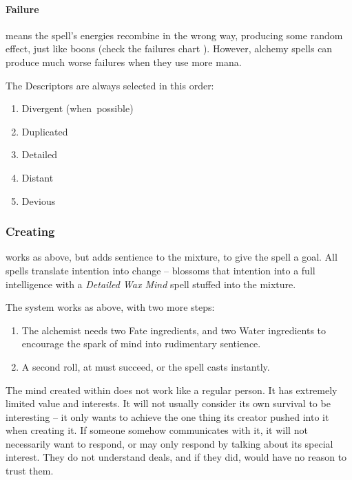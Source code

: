 \begin{multicols}{2}
\paragraph{Failure}
means the spell's energies recombine in the wrong way, producing some random effect, just like \glspl{boon} (check the failures chart ).
However, \gls{alchemy} spells can produce much worse failures when they use more mana.

The Descriptors are always selected in this order:

\begin{multicols}{2}
  \begin{enumerate}
  \raggedright
    \item
    Divergent (when~possible)
    \item
    Duplicated
    \item
    Detailed
    \item
    Distant
    \item
    Devious
  \end{enumerate}
\end{multicols}

\subsubsection{Creating }
works as above, but adds sentience to the mixture, to give the spell a goal.
All spells translate intention into change --  blossoms that intention into a full intelligence with a \textit{Detailed Wax Mind} spell stuffed into the mixture.

The system works as above, with two more steps:

\begin{enumerate}
  \item
  The alchemist needs two Fate \glspl{ingredient}, and two Water \glspl{ingredient} to encourage the spark of mind into rudimentary sentience.
  \item
  A second roll, at \tn[9] must succeed, or the spell casts instantly.
\end{enumerate}

The mind created within  does not work like a regular person.
It has extremely limited value and interests.
It will not usually consider its own survival to be interesting -- it only wants to achieve the one thing its creator pushed into it when creating it.
If someone somehow communicates with it, it will not necessarily want to respond, or may only respond by talking about its special interest.
They do not understand deals, and if they did, would have no reason to trust them.

\end{multicols}
